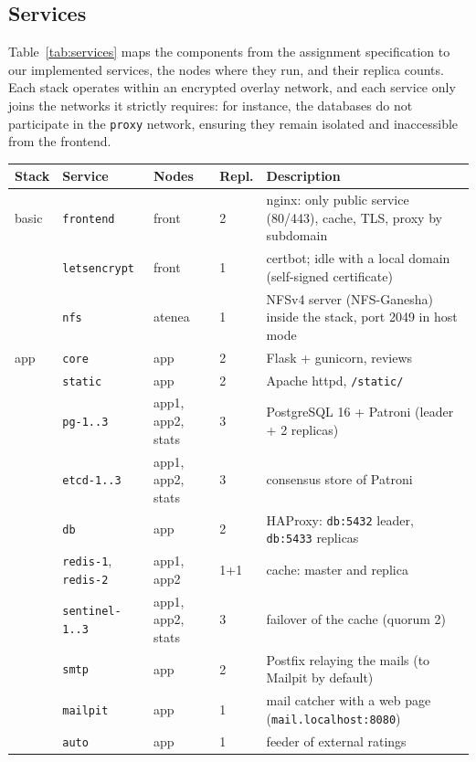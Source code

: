 \documentclass[11pt,a4paper]{article}
\newcommand{\svc}[1]{\texttt{#1}}
\begin{document}
\subsection{Services}

Table~\ref{tab:services} maps the components from the assignment specification to our implemented services,
the nodes where they run, and their replica counts. Each stack operates within an encrypted overlay network,
and each service only joins the networks it strictly requires: for instance, the databases do not participate
in the \texttt{proxy} network, ensuring they remain isolated and inaccessible from the frontend.

\begin{table}[ht]
\centering\small
\begin{tabularx}{\textwidth}{llllY}
\toprule
Stack & Service & Nodes & Repl. & Description \\
\midrule
basic  & \svc{frontend}    & front   & 2 & nginx: only public service (80/443), cache, TLS, proxy by subdomain \\
       & \svc{letsencrypt} & front   & 1 & certbot; idle with a local domain (self-signed certificate) \\
       & \svc{nfs}         & atenea  & 1 & NFSv4 server (NFS-Ganesha) inside the stack, port 2049 in host mode \\
\midrule
app    & \svc{core}        & app     & 2 & Flask + gunicorn, reviews \\
       & \svc{static}      & app     & 2 & Apache httpd, \texttt{/static/} \\
       & \svc{pg-1..3}    & app1, app2, stats & 3 & PostgreSQL 16 + Patroni (leader + 2 replicas) \\
       & \svc{etcd-1..3}   & app1, app2, stats & 3 & consensus store of Patroni \\
       & \svc{db}          & app     & 2 & HAProxy: \texttt{db:5432} leader, \texttt{db:5433} replicas \\
       & \svc{redis-1}, \svc{redis-2} & app1, app2 & 1+1 & cache: master and replica \\
       & \svc{sentinel-1..3} & app1, app2, stats & 3 & failover of the cache (quorum 2) \\
       & \svc{smtp}        & app     & 2 & Postfix relaying the mails (to Mailpit by default) \\
       & \svc{mailpit}     & app     & 1 & mail catcher with a web page (\texttt{mail.localhost:8080}) \\
       & \svc{auto}        & app     & 1 & feeder of external ratings \\

\end{tabularx}
\end{table}
\end{document}
